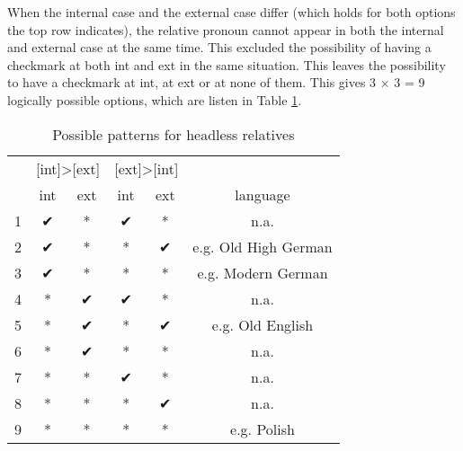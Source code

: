 When the internal case and the external case differ (which holds for both options the top row indicates), the relative pronoun cannot appear in both the internal and external case at the same time. This excluded the possibility of having a checkmark at both \ac{int} and \ac{ext} in the same situation. This leaves the possibility to have a checkmark at \ac{int}, at \ac{ext} or at none of them. This gives 3 × 3 = 9 logically possible options, which are listen in Table \ref{tbl:possible-headless-relatives}.

\begin{table}[ht]
  \center
  \caption{Possible patterns for headless relatives}
    \begin{tabular}{ccc|ccc}
    \toprule
      &   \multicolumn{2}{c}{[\ac{int}]>[\ac{ext}]} & \multicolumn{2}{|c}{[\ac{ext}]>[\ac{int}]} &                  \\
          \cmidrule(lr){2-3}                      \cmidrule(lr){4-5}
      &   \ac{int}            & \ac{ext}          & \ac{int}          & \ac{ext}            & language              \\
          \cmidrule(lr){2-2}  \cmidrule(lr){3-3}  \cmidrule(lr){4-4}  \cmidrule(lr){5-5}    \cmidrule(lr){6-6}
    1 &   ✔                   & *                 & ✔               & *                     & n.a.                  \\
    2 &   ✔                   & *                 & *               & ✔                     & e.g. Old High German  \\
    3 &   ✔                   & *                 & *               & *                     & e.g. Modern German    \\
    4 &   {*}                 & ✔                 & ✔               & *                     & n.a.                  \\
    5 &   {*}                 & ✔                 & *               & ✔                     & e.g. Old English      \\
    6 &   {*}                 & ✔                 & *               & *                     & n.a.                  \\
    7 &   {*}                 & *                 & ✔               & *                     & n.a.                  \\
    8 &   {*}                 & *                 & *               & ✔                     & n.a.                  \\
    9 &   {*}                 & *                 & *               & *                     & e.g. Polish           \\
    \bottomrule
  \end{tabular}
    \label{tbl:possible-headless-relatives}
\end{table}

